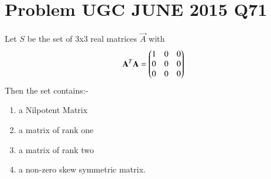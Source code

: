 \documentclass[journal,12pt]{IEEEtran}
\begin{document}
\section{\textbf{Problem UGC JUNE 2015 Q71}}
Let $S$ be the set of 3x3 real matrices $\vec{A}$ with 
\begin{align}
    \mathbf{A}^T\mathbf{A}=\begin{pmatrix}1&0&0\\0&0&0\\0&0&0\end{pmatrix}
\end{align}
Then the set contains:-\\
\begin{enumerate}
    \item a Nilpotent Matrix
    \item a matrix of rank one
    \item a matrix of rank two
    \item a non-zero skew symmetric matrix.
\end{enumerate}
\end{document}
